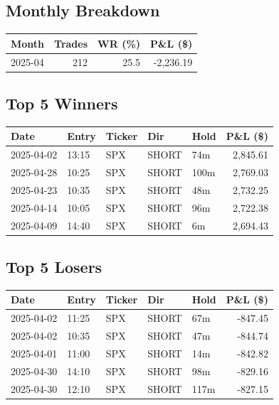 \documentclass[11pt,a4paper,twoside]{article}
\begin{document}
\subsection*{Monthly Breakdown}
\noindent\begin{center}
\begin{tabular}{>{\color{txtmain}}l rrr}
\toprule
\rowcolor{cardbg}
\textbf{Month} & \textbf{Trades} & \textbf{WR (\%)} & \textbf{P\&L (\$)} \\
\midrule
2025-04 & 212 & 25.5 & \textcolor{lossred}{-2,236.19} \\
\bottomrule
\end{tabular}
\end{center}
\subsection*{Top 5 Winners}
\noindent\begin{center}
\begin{tabular}{>{\color{txtmain}}l llll r}
\toprule
\rowcolor{cardbg}
\textbf{Date} & \textbf{Entry} & \textbf{Ticker} & \textbf{Dir} & \textbf{Hold} & \textbf{P\&L (\$)} \\
\midrule
2025-04-02 & 13:15 & SPX & SHORT & 74m & \textcolor{wingreen}{2,845.61} \\
2025-04-28 & 10:25 & SPX & SHORT & 100m & \textcolor{wingreen}{2,769.03} \\
2025-04-23 & 10:35 & SPX & SHORT & 48m & \textcolor{wingreen}{2,732.25} \\
2025-04-14 & 10:05 & SPX & SHORT & 96m & \textcolor{wingreen}{2,722.38} \\
2025-04-09 & 14:40 & SPX & SHORT & 6m & \textcolor{wingreen}{2,694.43} \\
\bottomrule
\end{tabular}
\end{center}
\subsection*{Top 5 Losers}
\noindent\begin{center}
\begin{tabular}{>{\color{txtmain}}l llll r}
\toprule
\rowcolor{cardbg}
\textbf{Date} & \textbf{Entry} & \textbf{Ticker} & \textbf{Dir} & \textbf{Hold} & \textbf{P\&L (\$)} \\
\midrule
2025-04-02 & 11:25 & SPX & SHORT & 67m & \textcolor{lossred}{-847.45} \\
2025-04-02 & 10:35 & SPX & SHORT & 47m & \textcolor{lossred}{-844.74} \\
2025-04-01 & 11:00 & SPX & SHORT & 14m & \textcolor{lossred}{-842.82} \\
2025-04-30 & 14:10 & SPX & SHORT & 98m & \textcolor{lossred}{-829.16} \\
2025-04-30 & 12:10 & SPX & SHORT & 117m & \textcolor{lossred}{-827.15} \\
\bottomrule
\end{tabular}
\end{center}
\clearpage
\end{document}
